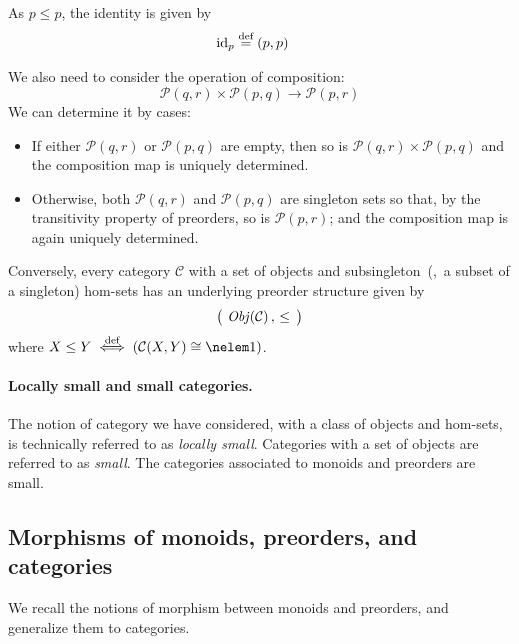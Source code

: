 As $p \leq p$, the identity is given by
\begin{align*}
\mathrm{id}_{ p } &\stackrel{\text{def}}{=} (p,p)
\end{align*}

We also need to consider the operation of composition:
\[
\mathcal{P}(q, r) \times \mathcal{P}(p, q) \to \mathcal{P}(p, r)
\]
We can determine it by cases:
\begin{itemize}
\item
If either $\mathcal{P}(q, r)$ or $\mathcal{P}(p, q)$ are empty, then so is
$\mathcal{P}(q, r) \times \mathcal{P}(p, q)$ and the composition map is
uniquely determined.

\item
Otherwise, both $\mathcal{P}(q, r)$ and $\mathcal{P}(p, q)$ are singleton
sets so that, by the transitivity property of preorders, so is
$\mathcal{P}(p, r)$; and the composition map is again uniquely determined.
\end{itemize}

Conversely, every category $\mathcal C$ with a set of objects and
subsingleton~(\viz,~a subset of a singleton) hom-sets has an underlying
preorder structure given by
\[
  \big(\, \operatorname{\mathit{Obj}}(\mathcal C) \,,\, \leq \,\big)
\]
where $X \leq Y \iffdef ( \mathcal{C}(X, Y) \iso \nelem 1 )$.

\paragraph{Locally small and small categories.}
%
The notion of category we have considered, with a class of objects and
hom-sets, is technically referred to as \emph{locally small}.  Categories with
a set of objects are referred to as \emph{small}.  The categories associated
to monoids and preorders are small.

\subsection{Morphisms of monoids, preorders, and categories}

We recall the notions of morphism between monoids and preorders, and
generalize them to categories.


